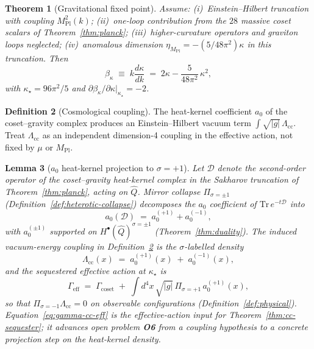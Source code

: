 \documentclass[aps,prd,onecolumn,amsmath,amssymb,nofootinbib,11pt]{revtex4-2}
\numberwithin{equation}{section}
\theoremstyle{plain}
\newtheorem{theorem}{Theorem}[section]
\newtheorem{lemma}[theorem]{Lemma}
\theoremstyle{definition}
\newtheorem{definition}[theorem]{Definition}
\theoremstyle{remark}
\newcommand{\MPl}{M_{\mathrm{Pl}}}
\begin{document}
\begin{theorem}[Gravitational fixed point]\label{thm:kappa}
Assume: (i)~Einstein--Hilbert truncation with coupling $\MPl^2(k)$;
(ii)~one-loop contribution from the $28$ massive coset scalars of
Theorem~\ref{thm:planck}; (iii)~higher-curvature operators and graviton loops
neglected; (iv)~anomalous dimension
$\eta_{\MPl}=-(5/48\pi^2)\kappa$ in this truncation. Then
\begin{equation}\label{eq:betakappa}
  \beta_\kappa\;\equiv\;k\frac{d\kappa}{dk}
  \;=\;2\kappa-\frac{5}{48\pi^2}\,\kappa^2,
\end{equation}
with $\kappa_\star=96\pi^2/5$ and
$\partial\beta_\kappa/\partial\kappa|_{\kappa_\star}=-2$.
\end{theorem}

\begin{definition}[Cosmological coupling]\label{def:cc}
The heat-kernel coefficient $a_0$ of the coset--gravity complex produces an
Einstein--Hilbert vacuum term $\int\sqrt{|g|}\,\Lambda_{\mathrm{cc}}$.
Treat $\Lambda_{\mathrm{cc}}$ as an independent dimension-4 coupling in the
effective action, not fixed by $\mu$ or $\MPl$.
\end{definition}

\begin{lemma}[$a_0$ heat-kernel projection to $\sigma=+1$]
\label{lem:a0-sigma-plus}
Let $\mathcal{D}$ denote the second-order operator of the coset--gravity
heat-kernel complex in the Sakharov truncation of Theorem~\ref{thm:planck},
acting on $\hat Q$. Mirror collapse
$\Pi_{\sigma=\pm1}$ (Definition~\ref{def:heterotic-collapse}) decomposes the
$a_0$ coefficient of $\mathrm{Tr}\,e^{-t\mathcal{D}}$ into
\begin{equation}\label{eq:a0-split}
  a_0(\mathcal{D})
  \;=\;
  a_0^{(+1)}+a_0^{(-1)},
\end{equation}
with $a_0^{(\pm1)}$ supported on $H^\bullet(\hat Q)^{\sigma=\pm1}$
(Theorem~\ref{thm:duality}). The induced vacuum-energy coupling in
Definition~\ref{def:cc} is the $\sigma$-labelled density
\begin{equation}\label{eq:a0-density}
  \Lambda_{\mathrm{cc}}(x)
  \;=\;
  a_0^{(+1)}(x)\;+\;a_0^{(-1)}(x),
\end{equation}
and the \emph{sequestered} effective action at $\kappa_\star$ is
\begin{equation}\label{eq:gamma-cc-eff}
  \Gamma_{\mathrm{eff}}
  \;=\;
  \Gamma_{\mathrm{coset}}
  \;+\;
  \int d^4x\,\sqrt{|g|}\,
  \Pi_{\sigma=+1}\,a_0^{(+1)}(x),
\end{equation}
so that $\Pi_{\sigma=-1}\Lambda_{\mathrm{cc}}=0$ on observable configurations
(Definition~\ref{def:physical}). Equation~\eqref{eq:gamma-cc-eff} is the
effective-action input for Theorem~\ref{thm:cc-sequester}; it advances
open problem \textbf{O6} from a coupling hypothesis to a concrete projection
step on the heat-kernel density.
\end{lemma}
\end{document}
